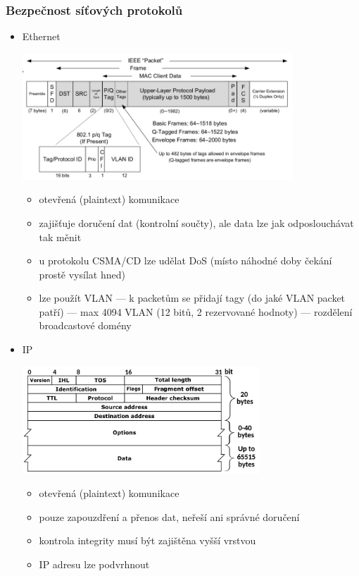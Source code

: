 \subsubsection*{Bezpečnost síťových protokolů}
\begin{itemize}
	\item Ethernet
	
	\includegraphics[width=0.8\textwidth]{img/OB-11_0.jpg}
	
	\begin{itemize}
		\item otevřená (plaintext) komunikace
		\item zajišťuje doručení dat (kontrolní součty), ale data lze jak odposlouchávat tak měnit
		\item u protokolu CSMA/CD lze udělat DoS (místo náhodné doby čekání prostě vysílat hned)
		\item lze použít VLAN --- k packetům se přidají tagy (do jaké VLAN packet patří) --- max 4094 VLAN (12 bitů, 2 rezervované hodnoty) --- rozdělení broadcastové domény
	\end{itemize}
	
	\item IP
	
	\includegraphics[width=0.7\textwidth]{img/OB-11_1.jpg}
	
	\begin{itemize}
		\item otevřená (plaintext) komunikace
		\item pouze zapouzdření a přenos dat, neřeší ani správné doručení
		\item kontrola integrity musí být zajištěna vyšší vrstvou
		\item IP adresu lze podvrhnout
	\end{itemize}
	

\end{itemize}
